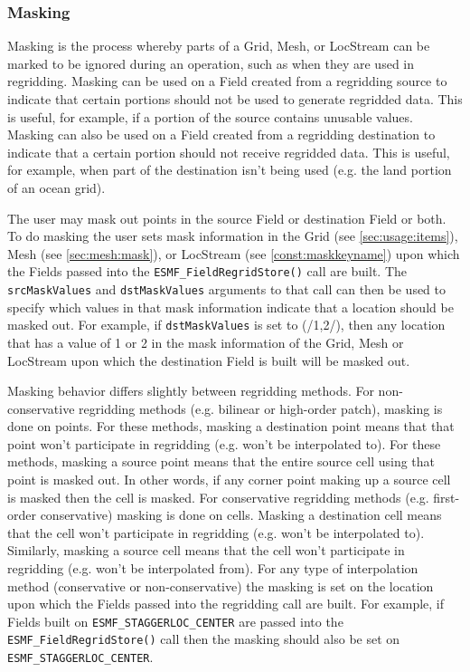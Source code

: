 \subsubsection{Masking}
\label {regrid:masking}
Masking is the process whereby parts of a Grid, Mesh, or LocStream 
can be marked to be ignored during an operation, such as when they 
are used in regridding.  Masking can be used on a Field created from 
a regridding source to indicate that certain portions should not be 
used to generate regridded data.  This is useful, for example, if a 
portion of the source contains unusable values.  Masking can also be 
used on a Field created from a regridding destination to indicate 
that a certain portion should not receive regridded data.  This is 
useful, for example, when part of the destination isn't being used 
(e.g. the land portion of an ocean grid).

The user may mask out points in the source
Field or destination Field or both. To do masking the user sets
mask information in the Grid (see \ref{sec:usage:items}), Mesh
(see \ref{sec:mesh:mask}), or LocStream (see \ref{const:maskkeyname})
upon which the Fields passed into the
{\tt ESMF\_FieldRegridStore()} call are built. The {\tt srcMaskValues}
and {\tt dstMaskValues} arguments to that
call can then be used to specify which values in that mask
information indicate that a location should be masked out. For
example, if {\tt dstMaskValues} is set to (/1,2/), then any location that
has a value of 1 or 2 in the mask information of the Grid, Mesh or LocStream
upon which the destination Field is built will be masked out.

Masking behavior differs slightly between regridding methods. For
non-conservative regridding methods (e.g. bilinear or high-order
patch), masking is done on points. For these methods, masking a
destination point means that that point won't participate in
regridding (e.g. won't be interpolated to). For these methods,
masking a source point means that the entire source cell using
that point is masked out. In other words, if any corner point
making up a source cell is masked then the cell is masked. For
conservative regridding methods (e.g. first-order conservative)
masking is done on cells. Masking a destination cell means that
the cell won't participate in regridding (e.g. won't be
interpolated to). Similarly, masking a source cell means that the
cell won't participate in regridding (e.g. won't be interpolated
from).  For any type of interpolation method (conservative or
non-conservative) the masking is set on the location upon
which the Fields passed into the regridding call are built.
For example, if Fields built on  {\tt ESMF\_STAGGERLOC\_CENTER} are
passed into the {\tt ESMF\_FieldRegridStore()} call then the masking
should also be set on {\tt ESMF\_STAGGERLOC\_CENTER}.

